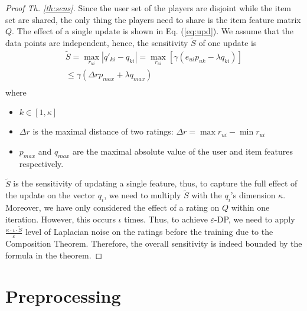 \documentclass[USenglish,oneside,twocolumn]{article}
\theoremstyle{plain}
\begin{document}
\begin{appendices}
        \begin{proof}[Proof Th. \ref{th:sens}]
            Since the user set of the players are disjoint while the item set are shared, the only thing the players need to share is the item feature matrix $Q$. The effect of a single update is shown in Eq. (\ref{eq:upd}). We assume that the data points are independent, hence, the sensitivity $\tilde{S}$ of one update is
            \begin{equation*}
            \begin{gathered}
            \tilde{S}=\max_{r_{ui}}|q'_{ki}-q_{ki}|=\max_{r_{ui}}[\gamma(e_{ui}p_{uk}-\lambda q_{ki})] \\
            \leq\gamma(\Delta rp_{max}+\lambda q_{max})\\
            \end{gathered}
            \end{equation*}
            where
            \begin{itemize}
                \item $k\in[1,\kappa]$
                \item $\Delta r$ is the maximal distance of two ratings: $\Delta r=\max{r_{ui}}-\min{r_{ui}}$
                \item $p_{max}$ and $q_{max}$ are the maximal absolute value of the user and item features respectively.
            \end{itemize}
            
            $\tilde{S}$ is the sensitivity of updating a single feature, thus, to capture the full effect of the update on the vector $q_i$, we need to multiply $\tilde{S}$ with the $q_i$'s dimension $\kappa$. Moreover, we have only considered the effect of a rating on $Q$ within one iteration. However, this occurs $\iota$ times. Thus, to achieve $\varepsilon$-DP, we need to apply $\frac{\kappa\cdot\iota\cdot\tilde{S}}{\varepsilon}$ level of Laplacian noise on the ratings before the training due to the Composition Theorem. Therefore, the overall sensitivity is indeed bounded by the formula in the theorem.
        \end{proof}
        
        \section{Preprocessing}
        \label{app:pre}
        

\end{appendices}
\end{document}
